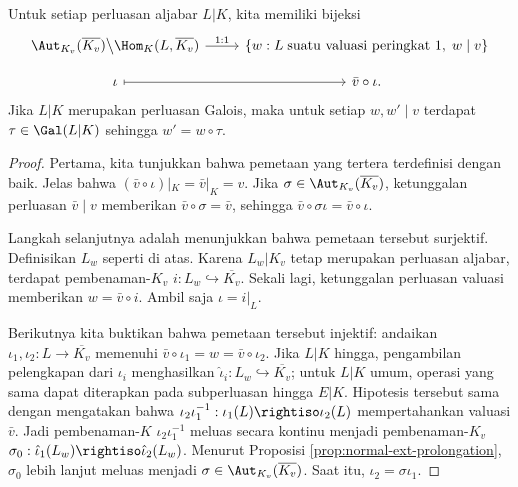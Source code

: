 \begin{theorem}\label{prop:valuation-ext-embedding}
	Untuk setiap perluasan aljabar $L|K$, kita memiliki bijeksi
	\[\begin{tikzcd}[row sep=small]
		\Aut_{K_v}(\overline{K_v}) \big\backslash \Hom_K(L, \overline{K_v}) \arrow[r, "1:1"] & \left\{ w: L\;\text{suatu valuasi peringkat $1$}, \; w \mid v \right\} \\
		\iota \arrow[mapsto, r] & \bar{v} \circ \iota.
	\end{tikzcd}\]
	Jika $L|K$ merupakan perluasan Galois, maka untuk setiap $w, w' \mid v$ terdapat $\tau \in \Gal(L|K)$ sehingga $w' = w \circ \tau$.
\end{theorem}
\begin{proof}
	Pertama, kita tunjukkan bahwa pemetaan yang tertera terdefinisi dengan baik. Jelas bahwa $(\bar{v} \circ \iota)|_K = \bar{v}|_K = v$. Jika $\sigma \in \Aut_{K_v}(\overline{K_v})$, ketunggalan perluasan $\bar{v} \mid v$ memberikan $\bar{v} \circ \sigma = \bar{v}$, sehingga $\bar{v} \circ \sigma\iota = \bar{v} \circ \iota$.
	
Langkah selanjutnya adalah menunjukkan bahwa pemetaan tersebut surjektif. Definisikan $L_w$ seperti di atas. Karena $L_w|K_v$ tetap merupakan perluasan aljabar, terdapat pembenaman-$K_v$ $i: L_w \hookrightarrow \overline{K_v}$. Sekali lagi, ketunggalan perluasan valuasi memberikan $w = \bar{v} \circ i$. Ambil saja $\iota = i|_L$.
	
	Berikutnya kita buktikan bahwa pemetaan tersebut injektif: andaikan $\iota_1, \iota_2: L \to \overline{K_v}$ memenuhi $\bar{v} \circ \iota_1 = w = \bar{v} \circ \iota_2$. Jika $L|K$ hingga, pengambilan pelengkapan dari $\iota_i$ menghasilkan $\hat{\iota}_i: L_w \hookrightarrow \overline{K_v}$; untuk $L|K$ umum, operasi yang sama dapat diterapkan pada subperluasan hingga $E|K$. Hipotesis tersebut sama dengan mengatakan bahwa $\iota_2 \iota_1^{-1}: \iota_1(L) \rightiso \iota_2(L)$ mempertahankan valuasi $\bar{v}$. Jadi pembenaman-$K$ $\iota_2 \iota_1^{-1}$ meluas secara kontinu menjadi pembenaman-$K_v$ $\sigma_0: \hat{\iota}_1(L_w) \rightiso \hat{\iota}_2(L_w)$. Menurut Proposisi \ref{prop:normal-ext-prolongation}, $\sigma_0$ lebih lanjut meluas menjadi $\sigma \in \Aut_{K_v}(\overline{K_v})$. Saat itu, $\iota_2 = \sigma \iota_1$.
	

\end{proof}
